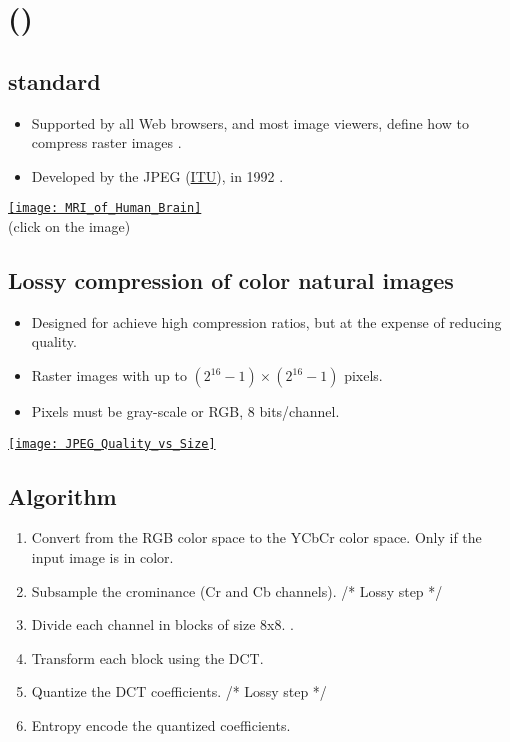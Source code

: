\chapter{ ()}

\section{ standard}
\begin{itemize}
\item Supported by all Web browsers, and most image viewers, define
  how to compress raster images \cite{ccitt.t81,wikipedia_ITU}.
\item Developed by the \gls{JPEG} (\href{https://www.itu.int}{ITU}),
  in 1992 \cite{wikipedia_JPEG}.
\end{itemize}
\vspace{-2ex}
\begin{center}
  \href{https://en.wikipedia.org/wiki/Magnetic_resonance_imaging_of_the_brain#/media/File:MRI_of_Human_Brain.jpg}{\texttt{[image: MRI\_of\_Human\_Brain]}}\\
  (click on the image)
\end{center}

\section{Lossy compression of color natural images}
\begin{itemize}
\item Designed for achieve high compression ratios, but at the expense of reducing quality.
  \item Raster images with up to $(2^{16}-1)\times (2^{16}-1)$ pixels.
  \item Pixels must be gray-scale or \gls{RGB}, 8 bits/channel.
\end{itemize}
\vspace{-2ex}
\begin{center}
  \href{https://www.thewebmaster.com/jpeg-definitive-guide/}{\texttt{[image: JPEG\_Quality\_vs\_Size]}}
\end{center}

\section{Algorithm}
\begin{enumerate}
\item Convert from the \gls{RGB} color space to the \gls{YCbCr} color
  space. Only if the input image is in color.
\item Subsample the crominance (Cr and Cb channels). /* Lossy step */
\item Divide each channel in blocks of size 8x8. .
\item Transform each block using the \gls{DCT}.
\item Quantize the \gls{DCT} coefficients. /* Lossy step */
\item Entropy encode the quantized coefficients.
\end{enumerate}


